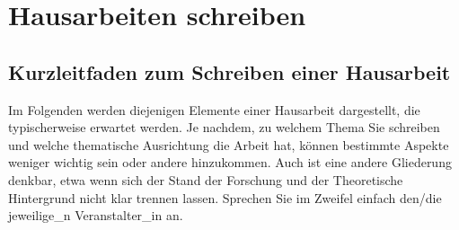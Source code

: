 \documentclass[ngerman,bibliography=totoc,oneside,12pt,a4paper]{scrbook}
\begin{document}
\chapter{Hausarbeiten schreiben}\label{hausarbeiten-schreiben}

\section{Kurzleitfaden zum Schreiben einer
Hausarbeit}\label{kurzleitfaden-zum-schreiben-einer-hausarbeit}

Im Folgenden werden diejenigen Elemente einer Hausarbeit dargestellt,
die typischerweise erwartet werden. Je nachdem, zu welchem Thema Sie
schreiben und welche thematische Ausrichtung die Arbeit hat, können
bestimmte Aspekte weniger wichtig sein oder andere hinzukommen. Auch ist
eine andere Gliederung denkbar, etwa wenn sich der Stand der Forschung
und der Theoretische Hintergrund nicht klar trennen lassen. Sprechen Sie
im Zweifel einfach den/die jeweilige\_n Veranstalter\_in an.
\end{document}

